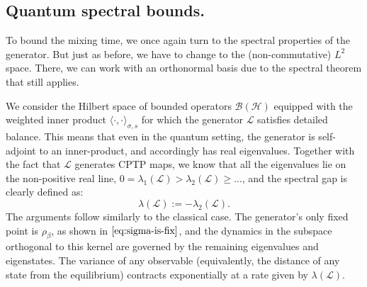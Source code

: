 
\smallskip
\subsection{Quantum spectral bounds.} To bound the mixing time, we once again turn to the spectral properties of the generator. But just as before, we have to change to the (non-commutative) $L^2$ space. There, we can work with an orthonormal basis due to the spectral theorem that still applies.

We consider the Hilbert space of bounded operators $\mathcal{B(H)}$ equipped with the weighted inner product $\langle \cdot, \cdot \rangle_{\sigma, s}$ for which the generator $\mathcal{L}$ satisfies detailed balance. This means that even in the quantum setting, the generator is self-adjoint to an inner-product, and accordingly has real eigenvalues. Together with the fact that $\mathcal{L}$ generates CPTP maps, we know that all the eigenvalues lie on the non-positive real line, $0 = \lambda_1(\mathcal{L}) > \lambda_2(\mathcal{L}) \geq \dots$, and the spectral gap is clearly defined as:
\begin{equation}
    \lambda(\mathcal{L}) := - \lambda_2(\mathcal{L}).
\end{equation}
The arguments follow similarly to the classical case. The generator's only fixed point is $\rho_\beta$, as shown in $\eqref{eq:sigma-is-fix}$, and the dynamics in the subspace orthogonal to this kernel are governed by the remaining eigenvalues and eigenstates. The variance of any observable (equivalently, the distance of any state from the equilibrium) contracts exponentially at a rate given by $\lambda(\mathcal{L})$.

